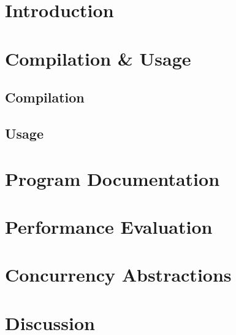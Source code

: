\section{Introduction}

\section{Compilation \& Usage}
\subsection{Compilation}
\subsection{Usage}

\section{Program Documentation}

\section{Performance Evaluation}

\section{Concurrency Abstractions}

\section{Discussion}
